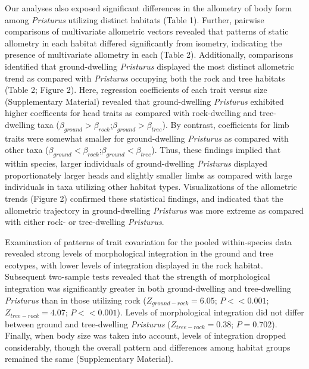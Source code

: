 \documentclass[
  11pt,
]{article}
\begin{document}
Our analyses also exposed significant differences in the allometry of
body form among \emph{Pristurus} utilizing distinct habitats (Table 1).
Further, pairwise comparisons of multivariate allometric vectors
revealed that patterns of static allometry in each habitat differed
significantly from isometry, indicating the presence of multivariate
allometry in each (Table 2). Additionally, comparisons identified that
ground-dwelling \emph{Pristurus} displayed the most distinct allometric
trend as compared with \emph{Pristurus} occupying both the rock and tree
habitats (Table 2; Figure 2). Here, regression coefficients of each
trait versus size (Supplementary Material) revealed that ground-dwelling
\emph{Pristurus} exhibited higher coefficents for head traits as
compared with rock-dwelling and tree-dwelling taxa
(\(\beta_{ground}>\beta_{rock}\);\(\beta_{ground}>\beta_{tree}\)). By
contrast, coefficients for limb traits were somewhat smaller for
ground-dwelling \emph{Pristurus} as compared with other taxa
(\(\beta_{ground}<\beta_{rock}\);\(\beta_{ground}<\beta_{tree}\)). Thus,
these findings implied that within species, larger individuals of
ground-dwelling \emph{Pristurus} displayed proportionately larger heads
and slightly smaller limbs as compared with large individuals in taxa
utilizing other habitat types. Visualizations of the allometric trends
(Figure 2) confirmed these statistical findings, and indicated that the
allometric trajectory in ground-dwelling \emph{Pristurus} was more
extreme as compared with either rock- or tree-dwelling \emph{Pristurus}.
\hfill\break

Examination of patterns of trait covariation for the pooled
within-species data revealed strong levels of morphological integration
in the ground and tree ecotypes, with lower levels of integration
displayed in the rock habitat. Subsequent two-sample tests revealed that
the strength of morphological integration was significantly greater in
both ground-dwelling and tree-dwelling \emph{Pristurus} than in those
utilizing rock (\(Z_{ground-rock}=6.05\); \(P << 0.001\);
\(Z_{tree-rock}=4.07\); \(P << 0.001\)). Levels of morphological
integration did not differ between ground and tree-dwelling
\emph{Pristurus} (\(Z_{tree-rock}=0.38\); \(P = 0.702\)). Finally, when
body size was taken into account, levels of integration dropped
considerably, though the overall pattern and differences among habitat
groups remained the same (Supplementary Material). \hfill\break
\end{document}
